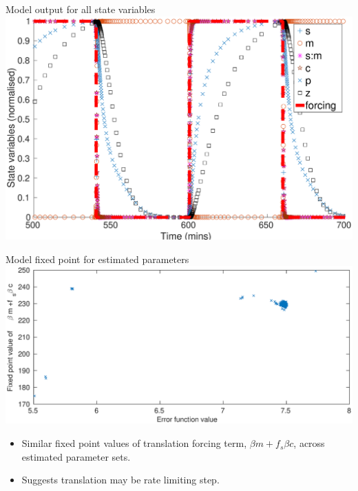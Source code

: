 \documentclass{beamer}
\begin{document}
\begin{frame}{Model output for all state variables}
  \includegraphics[scale = 0.25, clip = true, trim = 30 0 0 0]{Figures/model_output}
\end{frame}

\begin{frame}{Model fixed point for estimated parameters}
  \includegraphics[scale = 0.24, clip = true, trim = 0 0 0 0]{../Figures/fixedpoint_f}
\begin{itemize}
	\item Similar fixed point values of translation forcing term, ${\beta} m +{f_{s}}\beta c$, across estimated parameter sets.
	\item Suggests translation may be rate limiting step.
\end{itemize}
\end{frame}
\end{document}
